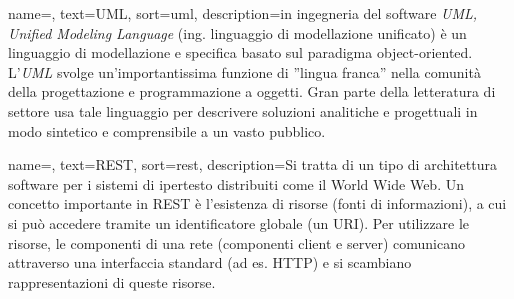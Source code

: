 
\renewcommand{\acronymname}{Acronimi e abbreviazioni}



    
    






{
    name=,
    text=UML,
    sort=uml,
    description={in ingegneria del software \emph{UML, Unified Modeling Language} (ing. linguaggio di modellazione unificato) è un linguaggio di modellazione e specifica basato sul paradigma object-oriented. L'\emph{UML} svolge un'importantissima funzione di ''lingua franca'' nella comunità della progettazione e programmazione a oggetti. Gran parte della letteratura di settore usa tale linguaggio per descrivere soluzioni analitiche e progettuali in modo sintetico e comprensibile a un vasto pubblico.}
}

{
	name=,
	text=REST,
	sort=rest,
	description={Si tratta di un tipo di architettura software per i sistemi di ipertesto distribuiti come il World Wide Web. Un concetto importante in REST è l’esistenza di risorse (fonti di informazioni), a cui si può accedere tramite un identificatore globale (un URI). Per utilizzare le risorse, le componenti di una rete (componenti client e server) comunicano attraverso una interfaccia standard (ad es. HTTP) e si scambiano rappresentazioni di queste risorse.}
}

